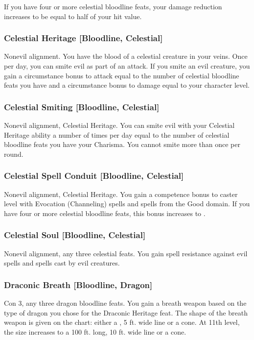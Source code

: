 If you have four or more celestial bloodline feats, your damage reduction increases to be equal to half of your hit value.

\subsubsection{Celestial Heritage [Bloodline, Celestial]}
 Nonevil alignment.
 You have the blood of a celestial creature in your veins. Once per day, you can smite evil as part of an attack. If you smite an evil creature, you gain a circumstance bonus to attack equal to the number of celestial bloodline feats you have and a circumstance bonus to damage equal to your character level.

\subsubsection{Celestial Smiting [Bloodline, Celestial]}
 Nonevil alignment, Celestial Heritage.
 You can smite evil with your Celestial Heritage ability a number of times per day equal to the number of celestial bloodline feats you have \add your Charisma. You cannot smite more than once per round.

\subsubsection{Celestial Spell Conduit [Bloodline, Celestial]}
 Nonevil alignment, Celestial Heritage.
 You gain a  competence bonus to caster level with Evocation (Channeling) spells and spells from the Good domain. If you have four or more celestial bloodline feats, this bonus increases to .

\subsubsection{Celestial Soul [Bloodline, Celestial]}
 Nonevil alignment, any three celestial feats.
 You gain spell resistance against evil spells and spells cast by evil creatures.

\subsubsection{Draconic Breath [Bloodline, Dragon]}
 Con 3, any three dragon bloodline feats.
 You gain a breath weapon based on the type of dragon you chose for the Draconic Heritage feat. The shape of the breath weapon is given on the  chart: either a \arealarge, 5 ft. wide line or a \areamed cone. At 11th level, the size increases to a 100 ft. long, 10 ft. wide line or a \arealarge cone.

